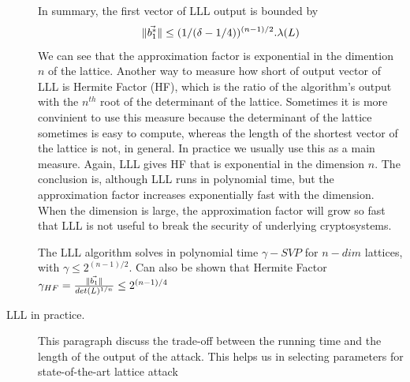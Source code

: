 \begin{description}
            In summary, the first vector of LLL output is bounded by
            \[
                \Vert \vec{b_1^*} \Vert \leq
                (1/(\delta-1/4))^{(n-1)/2}.\lambda(L)
            \]
            We can see that the approximation factor is exponential in the
            dimention $n$ of the lattice. Another way to measure how short of
            output vector of LLL is Hermite Factor (HF),
            which is  the ratio of the algorithm's output with the
            $n^{th}$ root of the determinant of the lattice. Sometimes it is
            more convinient to use this measure because the determinant of the
            lattice sometimes is easy to compute, whereas the length of the
            shortest vector of the lattice is not, in general. In practice we
            usually use this as a main measure. Again, LLL gives HF that is
            exponential in the dimension $n$. The conclusion is, although LLL
            runs in polynomial time, but the approximation factor increases
            exponentially fast with the dimension. When the dimension is large,
            the approximation factor will grow so fast that LLL
            is not useful to break the security of underlying cryptosystems.
            \begin{theorem}
                The LLL algorithm solves in polynomial time $\gamma-SVP$ for
                $n-dim$ lattices, with $\gamma \leq 2^{(n-1)/2}$. Can also be
                shown that Hermite Factor $\gamma_{HF} =
                \frac{\Vert \vec{b_1} \Vert}{det(L)^{1/n}} \leq 2^{(n-1)/4}$
                \label{theo:LLLHF}
            \end{theorem}


        \item [LLL in practice.] This paragraph discuss the trade-off between
            the running time and the length of the output of the attack. This
            helps us in selecting parameters for state-of-the-art lattice
            attack


\end{description}
